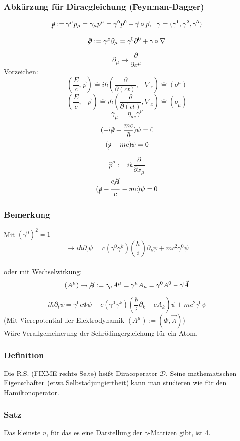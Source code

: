 \documentclass[twoside,a4paper]{scrartcl}
\newcommand{\D}{\mathcal{D}}
\renewcommand{\1}{\mathds{1}}
\newcommand{\ra}{\rightarrow}
\newcommand{\entspricht}{\mathrel{\widehat{=}}}
\begin{document}
\subsubsection*{Abkürzung für Diracgleichung (Feynman-Dagger)}
$$\xout{p}:=\gamma^\mu p_\mu=\gamma_\mu p^\mu=\gamma^0p^0-\vec \gamma \circ\vec p, \ \ \vec \gamma=(\gamma^1,\gamma^2,\gamma^3)$$
$$\xout{\partial}:=\gamma^\mu \partial_\mu=\gamma^0\partial^0+\vec \gamma \circ \nabla$$
$$\partial_\mu \ra \frac{\partial }{\partial x^\mu}$$
Vorzeichen:
$$(\frac{E}{c},\vec p)\entspricht i\hbar(\frac{\partial}{\partial (ct)},-\nabla_x)\entspricht (p^\mu)$$
$$(\frac{E}{c},-\vec p)\entspricht i\hbar(\frac{\partial}{\partial (ct)},\nabla_x)\entspricht (p_\mu)$$
$$\gamma_\mu= \eta_{\mu\nu}\gamma^\nu$$
$$(-i \xout{\partial}+\frac{mc}{\hbar})\psi=0$$
$$(\xout{p}-mc)\psi=0$$
$$\hat p^\mu:=i\hbar \frac{\partial}{\partial x_\mu}$$
$$(\xout{p}-\frac{e\xout{A}}{c}-mc)\psi=0$$

\subsubsection*{Bemerkung}
Mit $(\gamma^0)^2=1$
$$ \ra i \hbar \partial_t \psi=c(\gamma^0\gamma^k)(\frac{\hbar}{i})\partial_k \psi+mc^2\gamma^0 \psi$$\\
oder mit Wechselwirkung:
$$(A^\mu) \ra \xout{A}:=\gamma_\mu A^\mu=\gamma^\mu A_\mu=\gamma^0A^0-\vec \gamma \vec A$$
$$i\hbar \partial_t \psi=\gamma^0e\Phi\psi+c(\gamma^0\gamma^k)(\frac{\hbar}{i}\partial_k -eA_k)\psi+mc^2\gamma^0 \psi$$
(Mit Vierepotential der Elektrodynamik $(A^\mu):=(\Phi,\vec A)$)\\
Wäre Verallgemeinerung der Schrödingergleichung für ein Atom.
\subsubsection*{Definition}
Die R.S. (FIXME rechte Seite) heißt Diracoperator $\D$. Seine mathematischen Eigenschaften (etwa Selbstadjungiertheit) kann man studieren wie für den Hamiltonoperator.
\subsubsection*{Satz}
Das kleinste $n$, für das es eine Darstellung der $\gamma$-Matrizen gibt, ist 4.
\end{document}

